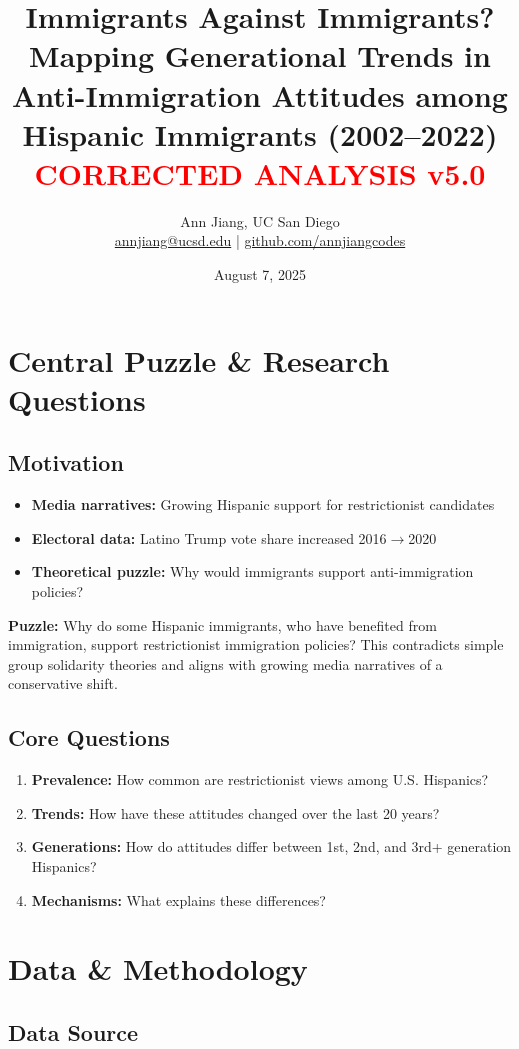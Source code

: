 \documentclass[11pt,letterpaper]{article}
\title{\textbf{Immigrants Against Immigrants?}\\
\large Mapping Generational Trends in Anti-Immigration Attitudes among Hispanic Immigrants (2002--2022)\\
\textcolor{red}{\normalsize CORRECTED ANALYSIS v5.0}}
\author{Ann Jiang, UC San Diego\\
\href{mailto:annjiang@ucsd.edu}{annjiang@ucsd.edu} | \href{https://github.com/annjiangcodes}{github.com/annjiangcodes}}
\date{August 7, 2025}
\newcommand{\compactdesc}[2]{\item \textbf{#1:} #2}
\begin{document}
\maketitle

\section{Central Puzzle \& Research Questions}

\subsection{Motivation}
\begin{itemize}
    \compactdesc{Media narratives}{Growing Hispanic support for restrictionist candidates}
    \compactdesc{Electoral data}{Latino Trump vote share increased 2016$\rightarrow$2020}
    \compactdesc{Theoretical puzzle}{Why would immigrants support anti-immigration policies?}
\end{itemize}

\textbf{Puzzle:} Why do some Hispanic immigrants, who have benefited from immigration, support restrictionist immigration policies? This contradicts simple group solidarity theories and aligns with growing media narratives of a conservative shift.

\subsection{Core Questions}
\begin{enumerate}
    \item \textbf{Prevalence:} How common are restrictionist views among U.S. Hispanics?
    \item \textbf{Trends:} How have these attitudes changed over the last 20 years?
    \item \textbf{Generations:} How do attitudes differ between 1st, 2nd, and 3rd+ generation Hispanics?
    \item \textbf{Mechanisms:} What explains these differences?
\end{enumerate}

\section{Data \& Methodology}

\subsection{Data Source}
\end{document}
